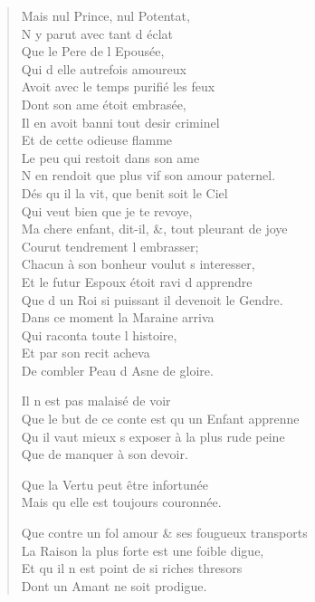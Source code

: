 \documentclass[14pt,a4paper]{memoir}
\begin{document}
{{\begin{otherlanguage}{french}
\begin{verse}
\vin Mais nul Prince, nul Potentat, \\
\vin N\textquotesingle{} y parut avec tant d\textquotesingle{} éclat \\
\vin Que le Pere de l\textquotesingle{} Epousée, \\
\vin Qui d\textquotesingle{} elle autrefois amoureux \\
Avoit avec le temps purifié les feux \\
\vin Dont son ame étoit embrasée, \\
Il en avoit banni tout desir criminel \\
\vin Et de cette odieuse flamme \\
\vin Le peu qui restoit dans son ame \\
N\textquotesingle{} en rendoit que plus vif son amour paternel. \\
\vin Dés qu\textquotesingle{} il la vit, que benit soit le Ciel \\
\vin Qui veut bien que je te revoye, \\
Ma chere enfant, dit-il, \&, tout pleurant de joye \\
\vin Courut tendrement l\textquotesingle{} embrasser; \\
Chacun à son bonheur voulut s\textquotesingle{} interesser, \\
Et le futur Espoux étoit ravi d\textquotesingle{} apprendre \\
Que d\textquotesingle{} un Roi si puissant il devenoit le Gendre. \\
\vin Dans ce moment la Maraine arriva \\
\vin Qui raconta toute l\textquotesingle{} histoire, \\
\vin Et par son recit acheva \\
\vin De combler Peau d\textquotesingle{} Asne de gloire.

\vin Il n\textquotesingle{} est pas malaisé de voir \\
Que le but de ce conte est qu\textquotesingle{} un Enfant apprenne \\
Qu\textquotesingle{} il vaut mieux s\textquotesingle{} exposer à la plus rude peine \\
\vin Que de manquer à son devoir.

\vin Que la Vertu peut être infortunée \\
\vin Mais qu\textquotesingle{} elle est toujours couronnée.

Que contre un fol amour \& ses fougueux transports \\
La Raison la plus forte est une foible digue, \\
\vin Et qu\textquotesingle{} il n\textquotesingle{} est point de si riches thresors \\
\vin Dont un Amant ne soit prodigue.


\end{verse}
\end{otherlanguage}}}
\end{document}
